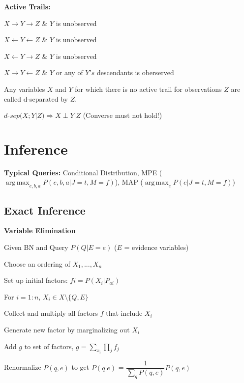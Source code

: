 \documentclass[a4paper, 11pt, landscape]{article}
\DeclareMathOperator*{\argmax}{arg\,max}
\begin{document}
\begin{multicols*}{3}
		\textbf{Active Trails:}
		\begin{compactitem}
			\item  $X \rightarrow  Y \rightarrow Z$ \& $Y$ is unobserved
			\item  $X \leftarrow  Y \leftarrow Z$ \& $Y$ is unobserved
			\item  $X \leftarrow  Y \rightarrow Z$ \& $Y$ is unobserved
			\item  $X \rightarrow  Y \leftarrow Z$ \& $Y$ or any of $Y's$ descendants is oberserved
		\end{compactitem}
	
		Any variables $X$ and $Y$ for which there is no active trail for observations $Z$ are called d‐separated by $Z$. 
		
		$d$-$sep(X;Y | Z) \Rightarrow X \perp Y | Z$ (Converse must not hold!)
		
		\section{Inference}
		\textbf{Typical Queries:} Conditional Distribution, MPE ($\argmax_{e,b,a} P(e,b,a | J=t, M = f)$), MAP ($\argmax_{e} P(e | J=t, M = f)$)
		
		\subsection{Exact Inference}
		
		\textbf{Variable Elimination}
		
		\begin{compactitem}
			
		\item Given BN and Query $P(Q | E=e)$ ($E$ = evidence variables)
		\item Choose an ordering of $X_1, ..., X_n$
		\item Set up initial factors: $fi = P(X_i | P_{ai})$
		\item For $i =1:n$, $X_i  \in X\setminus \{Q,E\}$
		\begin{compactenum}
			\item Collect and multiply all factors $f$ that include $X_i$  
			\item Generate new factor by marginalizing out $X_i$
			\item Add $g$ to set of factors, $g = \sum_{x_i}\prod_{j}f_j$
		\end{compactenum}
		\item  Renormalize $P(q,e)$ to get $P(q | e)$ = $\dfrac{1}{\sum_{q}P(q,e)}P(q,e)$
		

\end{compactitem}
\end{multicols*}
\end{document}
